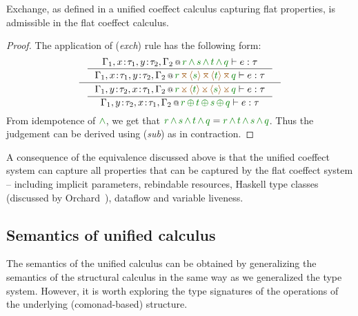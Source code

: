 \begin{lemma}
\label{thm:further-rev-exch}
Exchange, as defined in a unified coeffect calculus capturing flat properties, is admissible in
the flat coeffect calculus.
\end{lemma}
\begin{proof}
The application of (\emph{exch}) rule has the following form:
\begin{equation*}
\inference
 {\inference
    {\coctx{\Gamma_1,x\!:\!\tau_1,y\!:\!\tau_2,\Gamma_2}{\cclrd{r} \,\czip\, \cclrd{s} \,\czip\, \cclrd{t} \,\czip\, \cclrd{q}} \vdash e : \tau}
    {\coctx{\Gamma_1,x\!:\!\tau_1,y\!:\!\tau_2,\Gamma_2}{\cclrd{r} \,\azip\, \alift{\cclrd{s}} \,\azip\, \alift{\cclrd{t}} \,\azip\, \cclrd{q}} \vdash e : \tau} }
 {\inference
    {\coctx{\Gamma_1,y\!:\!\tau_2,x\!:\!\tau_1,\Gamma_2}{\cclrd{r} \,\apar\, \alift{\cclrd{t}} \,\apar\, \alift{\cclrd{s}} \,\apar\, \cclrd{q}} \vdash e : \tau}
    {\coctx{\Gamma_1,y\!:\!\tau_2,x\!:\!\tau_1,\Gamma_2}{\cclrd{r} \,\cpar\, \cclrd{t} \,\cpar\, \cclrd{s} \,\cpar\, \cclrd{q}} \vdash e : \tau} }
\end{equation*}
%
From idempotence of $\czip$, we get that $\cclrd{r} \,\czip\, \cclrd{s} \,\czip\, \cclrd{t} \,\czip\, \cclrd{q} =
\cclrd{r} \,\czip\, \cclrd{t} \,\czip\, \cclrd{s} \,\czip\, \cclrd{q}$. Thus the judgement can be derived using
(\emph{sub}) as in contraction.
\end{proof}

\noindent
A consequence of the equivalence discussed above is that the unified coeffect system can capture
all properties that can be captured by the flat coeffect system -- including implicit parameters,
rebindable resources, Haskell type classes (discussed by Orchard~\cite{comonads-dom-thesis}),
dataflow and variable liveness.


\subsection{Semantics of unified calculus}
\label{sec:further-semantics}

The semantics of the unified calculus can be obtained by generalizing the semantics of the structural
calculus in the same way as we generalized the type system. However, it is worth exploring the type
signatures of the operations of the underlying (comonad-based) structure.

